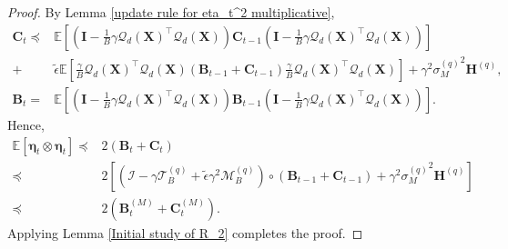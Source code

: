 \documentclass[11pt, letterpaper]{article}
\begin{document}
\begin{proof}
    By Lemma \ref{update rule for eta_t^2 multiplicative},
    \begin{equation*}
        \begin{aligned}
            \mathbf{C}_t
            \preceq&\mathbb{E}\left[\left(\mathbf{I}-\frac{1}{B}\gamma {\mathcal{Q}_d(\mathbf{X})}^\top \mathcal{Q}_d(\mathbf{X}) \right)\mathbf{C}_{t-1}\left(\mathbf{I}-\frac{1}{B}\gamma {\mathcal{Q}_d(\mathbf{X})}^\top \mathcal{Q}_d(\mathbf{X}) \right)\right]\\
            +&\tilde{\epsilon}\mathbb{E}\left[\frac{\gamma}{B}{\mathcal{Q}_d(\mathbf{X})}^\top {\mathcal{Q}_d(\mathbf{X})}(\mathbf{B}_{t-1}+\mathbf{C}_{t-1})\frac{\gamma}{B}{\mathcal{Q}_d(\mathbf{X})}^\top\mathcal{Q}_d(\mathbf{X})\right]
            +\gamma^2 {\sigma_M^{(q)}}^2\mathbf{H}^{(q)},\\
            \mathbf{B}_t=& \mathbb{E}\left[\left(\mathbf{I}-\frac{1}{B}\gamma {\mathcal{Q}_d(\mathbf{X})}^\top \mathcal{Q}_d(\mathbf{X}) \right)\mathbf{B}_{t-1}\left(\mathbf{I}-\frac{1}{B}\gamma {\mathcal{Q}_d(\mathbf{X})}^\top \mathcal{Q}_d(\mathbf{X}) \right)\right].
        \end{aligned}
    \end{equation*}
    Hence,
    \begin{equation*}
        \begin{aligned}
            \mathbb{E}\left[\boldsymbol{\eta}_t \otimes \boldsymbol{\eta}_t\right] \preceq &2(\mathbf{B}_t+\mathbf{C}_t)\\
            \preceq&2\left[(\mathcal{I}-\gamma \mathcal{T}_B^{(q)}+\tilde{\epsilon}\gamma^2\mathcal{M}_B^{(q)})\circ\left(\mathbf{B}_{t-1}+\mathbf{C}_{t-1}\right)+\gamma^2 {\sigma_M^{(q)}}^2\mathbf{H}^{(q)}\right]\\
            \preceq&2\left(\mathbf{B}_t^{(M)}+\mathbf{C}_t^{(M)}\right).
        \end{aligned}
    \end{equation*}
    Applying Lemma \ref{Initial study of R_2} completes the proof.
\end{proof}
\end{document}
